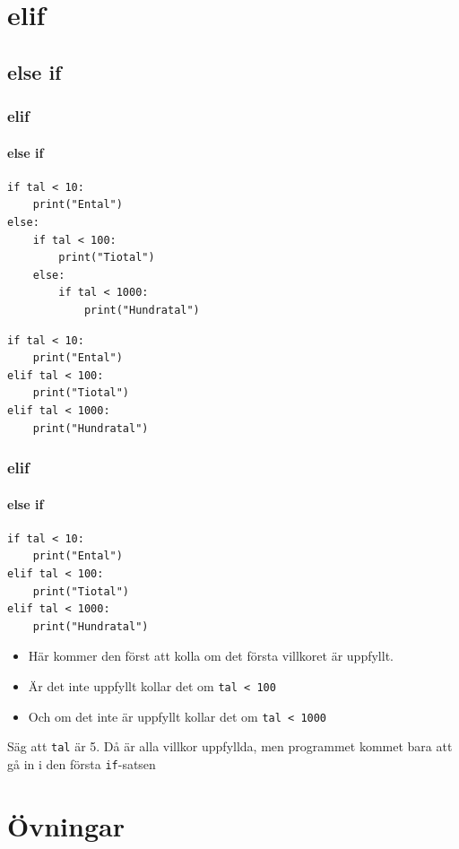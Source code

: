 \documentclass{beamer}
\begin{document}
\section{elif}

\subsection{else if}

\begin{frame}[fragile]
	\frametitle{elif}
	\framesubtitle{else if}
	
	\begin{lstlisting}
if tal < 10:
    print("Ental")
else:
    if tal < 100:
        print("Tiotal")
    else:
        if tal < 1000:
            print("Hundratal")
	\end{lstlisting}
	\pause
	\begin{lstlisting}
if tal < 10:
    print("Ental")
elif tal < 100:
    print("Tiotal")
elif tal < 1000:
    print("Hundratal")
	\end{lstlisting}
	
\end{frame}

\begin{frame}[fragile]
	\frametitle{elif}
	\framesubtitle{else if}
	
	\begin{lstlisting}
if tal < 10:
    print("Ental")
elif tal < 100:
    print("Tiotal")
elif tal < 1000:
    print("Hundratal")
	\end{lstlisting}
	
	\begin{itemize}
		\item Här kommer den först att kolla om det första villkoret är uppfyllt.
		\item Är det inte uppfyllt kollar det om \texttt{tal < 100}
		\item Och om det inte är uppfyllt kollar det om \texttt{tal < 1000}
	\end{itemize}
	
	Säg att \texttt{tal} är 5. Då är alla villkor uppfyllda, men programmet kommet bara att gå in i den första \texttt{if}-satsen 		
	
\end{frame}

\section{Övningar}
\end{document}
